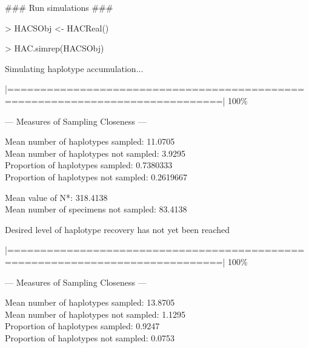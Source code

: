{\tt \scriptsize

{\noindent \#\#\# Run simulations \#\#\#}

\vspace{1mm}

{\noindent > HACSObj <- HACReal()}

\vspace{1mm}

{\noindent > HAC.simrep(HACSObj)} 

\vspace{1mm}

\noindent Simulating haplotype accumulation...

\vspace{2mm}
 
\noindent |==============================================================================| 100\%
  
\vspace{3mm}
 
\noindent --- Measures of Sampling Closeness ---

\vspace{2mm} 
 
\noindent Mean number of haplotypes sampled: 11.0705  \\
Mean number of haplotypes not sampled: 3.9295 \\
Proportion of haplotypes sampled: 0.7380333 \\
Proportion of haplotypes not sampled: 0.2619667   

\vspace{2mm} 
 
\noindent Mean value of N*: 318.4138 \\
Mean number of specimens not sampled: 83.4138

\vspace{3mm}
 
\noindent Desired level of haplotype recovery has not yet been reached 

\vspace{2mm}

\noindent |==============================================================================| 100\%

\vspace{3mm}

\noindent --- Measures of Sampling Closeness ---

\vspace{2mm} 
 
\noindent Mean number of haplotypes sampled: 13.8705  \\
Mean number of haplotypes not sampled: 1.1295 \\
Proportion of haplotypes sampled: 0.9247 \\
Proportion of haplotypes not sampled: 0.0753    

}
